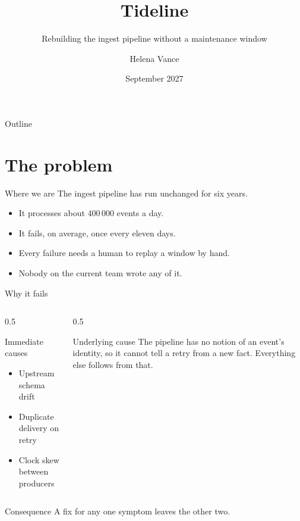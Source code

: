 \documentclass[aspectratio=169,11pt]{beamer}
\title[Tideline]{Tideline}
\subtitle{Rebuilding the ingest pipeline without a maintenance window}
\author[H.\ Vance]{Helena Vance}
\institute[Northwind]{Northwind Ferry Cooperative \\ Platform Team}
\date{September 2027}
\begin{document}
\begin{frame}
  \titlepage
\end{frame}

\begin{frame}{Outline}
  \tableofcontents
\end{frame}

\section{The problem}

\begin{frame}{Where we are}
  The ingest pipeline has run unchanged for six years.

  \begin{itemize}
    \item<1-> It processes about 400\,000 events a day.
    \item<2-> It fails, on average, once every eleven days.
    \item<3-> Every failure needs a human to replay a window by hand.
    \item<4-> Nobody on the current team wrote any of it.
  \end{itemize}

\end{frame}

\begin{frame}{Why it fails}
  \begin{columns}[T]
    \begin{column}{0.5\textwidth}
      \begin{block}{Immediate causes}
        \begin{itemize}
          \item Upstream schema drift
          \item Duplicate delivery on retry
          \item Clock skew between producers
        \end{itemize}
      \end{block}
    \end{column}
    \begin{column}{0.5\textwidth}
      \begin{block}{Underlying cause}
        The pipeline has no notion of an event's identity, so it cannot tell a
        retry from a new fact. Everything else follows from that.
      \end{block}
    \end{column}
  \end{columns}

  \vspace{1em}
  \begin{exampleblock}{Consequence}
    A fix for any one symptom leaves the other two.
  \end{exampleblock}
\end{frame}
\end{document}
